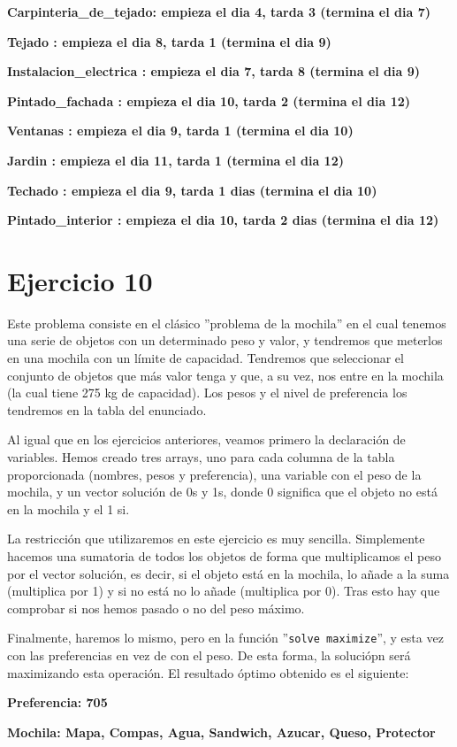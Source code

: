 \documentclass[11pt,a4paper]{article}
\begin{document}
\textbf{Carpinteria\_de\_tejado: empieza el dia 4, tarda 3 (termina el dia 7)}\vspace{-8px}

\textbf{Tejado : empieza el dia 8, tarda 1 (termina el dia 9)} \vspace{-8px}

\textbf{Instalacion\_electrica : empieza el dia 7, tarda 8 (termina el dia 9)}\vspace{-8px}

\textbf{Pintado\_fachada : empieza el dia 10, tarda 2 (termina el dia 12)} \vspace{-8px}

\textbf{Ventanas : empieza el dia 9, tarda 1 (termina el dia 10)} \vspace{-8px}

\textbf{Jardin : empieza el dia 11, tarda 1 (termina el dia 12)} \vspace{-8px}

\textbf{Techado : empieza el dia 9, tarda 1 dias (termina el dia 10)} \vspace{-8px}

\textbf{Pintado\_interior : empieza el dia 10, tarda 2 dias (termina el dia 12)} \vspace{-8px}



\section*{Ejercicio 10}
Este problema consiste en el clásico ''problema de la mochila'' en el cual tenemos una serie de objetos con un determinado peso y valor, y
tendremos que meterlos en una mochila con un límite de capacidad. Tendremos que seleccionar el conjunto de objetos que más valor tenga y que,
a su vez, nos entre en la mochila (la cual tiene 275 kg de capacidad). Los pesos y el nivel de preferencia los tendremos en la tabla del
enunciado.

Al igual que en los ejercicios anteriores, veamos primero la declaración de variables. Hemos creado tres arrays, uno para cada columna de la
tabla proporcionada (nombres, pesos y preferencia), una variable con el peso de la mochila, y un vector solución de 0s y 1s, donde 0 significa
que el objeto no está en la mochila y el 1 si.

La restricción que utilizaremos en este ejercicio es muy sencilla. Simplemente hacemos una sumatoria de todos los objetos de forma que
multiplicamos el peso por el vector solución, es decir, si el objeto está en la mochila, lo añade a la suma (multiplica por 1) y si no está
no lo añade (multiplica por 0). Tras esto hay que comprobar si nos hemos pasado o no del peso máximo.

Finalmente, haremos lo mismo, pero en la función ''\texttt{solve maximize}'', y esta vez con las preferencias en vez de con el peso. De esta
forma, la soluciópn será maximizando esta operación. El resultado óptimo obtenido es el siguiente:

\textbf{Preferencia: 705}

\textbf{Mochila: Mapa, Compas, Agua, Sandwich, Azucar, Queso, Protector}
\end{document}
